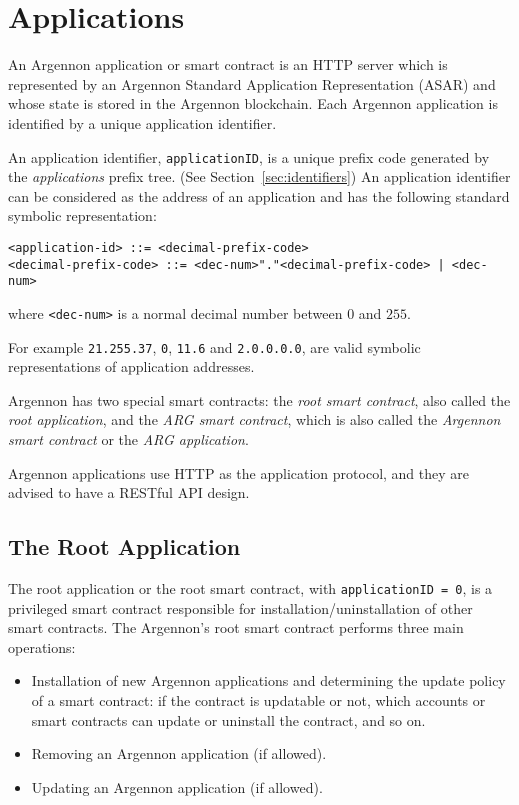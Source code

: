 

\section{Applications}\label{sec:applications}

An Argennon application or smart contract is an HTTP server which is represented by an Argennon Standard Application
Representation (ASAR) and whose state is stored in the Argennon blockchain. Each Argennon application is identified by
a unique application identifier.

An application identifier, \texttt{applicationID}, is a unique prefix code generated by the \emph{applications}
prefix tree. (See Section~\ref{sec:identifiers}) An application identifier can be considered as the address of an
application and has the following standard symbolic representation:
\begin{verbatim}
<application-id> ::= <decimal-prefix-code>
<decimal-prefix-code> ::= <dec-num>"."<decimal-prefix-code> | <dec-num>
\end{verbatim}
where \texttt{<dec-num>} is a normal decimal number between $0$ and $255$.

For example \texttt{21.255.37}, \texttt{0}, \texttt{11.6} and \texttt{2.0.0.0.0}, are valid symbolic
representations of application addresses.

Argennon has two special smart contracts: the \emph{root smart contract}, also called the \emph{root application}, and
the \emph{ARG smart contract}, which is also called the \emph{Argennon smart contract} or the \emph{ARG application}.

Argennon applications use HTTP as the application protocol, and they are advised to have a RESTful API design.

\subsection{The Root Application}\label{subsec:the-root-app}

The root application or the root smart contract, with \texttt{applicationID = 0}, is a privileged smart contract
responsible for installation/uninstallation of other smart contracts. The Argennon's root smart contract
performs three main operations:

\begin{itemize}
    \item Installation of new Argennon applications and determining the update policy of a smart
    contract: if the contract is updatable or not, which accounts or smart contracts can update or uninstall
    the contract, and so on.
    \item Removing an Argennon application (if allowed).
    \item Updating an Argennon application (if allowed).
\end{itemize}

